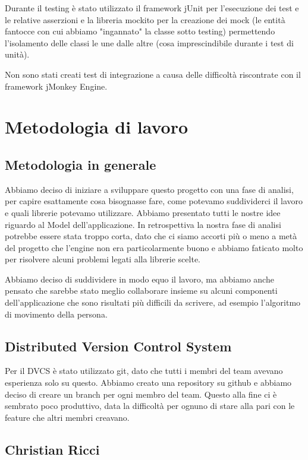 \documentclass[a4paper,12pt]{report}
\begin{document}
Durante il testing è stato utilizzato il framework jUnit per l'esecuzione dei test e le relative asserzioni e la libreria mockito per la creazione dei mock (le entità fantocce con cui abbiamo "ingannato" la classe sotto testing) permettendo l'isolamento delle classi le une dalle altre (cosa imprescindibile durante i test di unità).

Non sono stati creati test di integrazione a causa delle difficoltà riscontrate con il framework jMonkey Engine.

\section{Metodologia di lavoro}

\subsection{Metodologia in generale}

Abbiamo deciso di iniziare a sviluppare questo progetto con una fase di analisi, per capire esattamente cosa bisognasse fare, come potevamo suddividerci il lavoro e quali librerie potevamo utilizzare. Abbiamo presentato tutti le nostre idee riguardo al Model dell'applicazione. In retrospettiva la nostra fase di analisi potrebbe essere stata troppo corta, dato che ci siamo accorti più o meno a metà del progetto che l'engine non era particolarmente buono e abbiamo faticato molto per risolvere alcuni problemi legati alla librerie scelte.

Abbiamo deciso di suddividere in modo equo il lavoro, ma abbiamo anche pensato che sarebbe stato meglio collaborare insieme su alcuni componenti dell'applicazione che sono risultati più difficili da scrivere, ad esempio l'algoritmo di movimento della persona.

\subsection{Distributed Version Control System}

Per il DVCS è stato utilizzato git, dato che tutti i membri del team avevano esperienza solo su questo. Abbiamo creato una repository su github e abbiamo deciso di creare un branch per ogni membro del team. Questo alla fine ci è sembrato poco produttivo, data la difficoltà per ognuno di stare alla pari con le feature che altri membri creavano.

\subsection{Christian Ricci}
\end{document}
